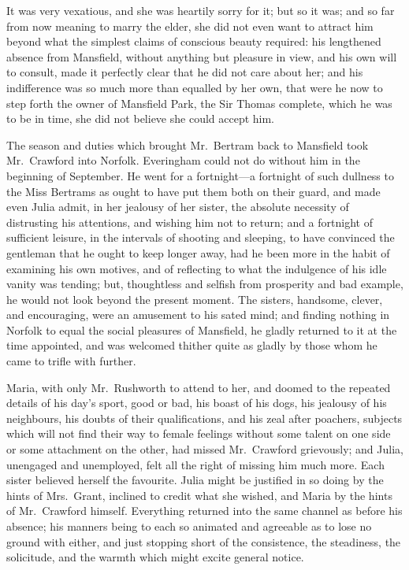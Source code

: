 It was very vexatious, and she was heartily sorry for it;
but so it was; and so far from now meaning to marry
the elder, she did not even want to attract him beyond
what the simplest claims of conscious beauty required:
his lengthened absence from Mansfield, without anything
but pleasure in view, and his own will to consult, made it
perfectly clear that he did not care about her; and his
indifference was so much more than equalled by her own,
that were he now to step forth the owner of Mansfield Park,
the Sir Thomas complete, which he was to be in time, she did
not believe she could accept him.

The season and duties which brought Mr.\ Bertram back to
Mansfield took Mr.\ Crawford into Norfolk.  Everingham could
not do without him in the beginning of September.  He went
for a fortnight---a fortnight of such dullness to the Miss
Bertrams as ought to have put them both on their guard,
and made even Julia admit, in her jealousy of her sister,
the absolute necessity of distrusting his attentions,
and wishing him not to return; and a fortnight of sufficient
leisure, in the intervals of shooting and sleeping, to have
convinced the gentleman that he ought to keep longer away,
had he been more in the habit of examining his own motives,
and of reflecting to what the indulgence of his idle vanity
was tending; but, thoughtless and selfish from prosperity
and bad example, he would not look beyond the present moment.
The sisters, handsome, clever, and encouraging, were an
amusement to his sated mind; and finding nothing in Norfolk
to equal the social pleasures of Mansfield, he gladly
returned to it at the time appointed, and was welcomed
thither quite as gladly by those whom he came to trifle with
further.

Maria, with only Mr.\ Rushworth to attend to her, and doomed
to the repeated details of his day's sport, good or bad,
his boast of his dogs, his jealousy of his neighbours,
his doubts of their qualifications, and his zeal after poachers,
subjects which will not find their way to female feelings
without some talent on one side or some attachment on
the other, had missed Mr.\ Crawford grievously; and Julia,
unengaged and unemployed, felt all the right of missing him
much more.  Each sister believed herself the favourite.
Julia might be justified in so doing by the hints
of Mrs.\ Grant, inclined to credit what she wished,
and Maria by the hints of Mr.\ Crawford himself.
Everything returned into the same channel as before his absence;
his manners being to each so animated and agreeable
as to lose no ground with either, and just stopping short
of the consistence, the steadiness, the solicitude,
and the warmth which might excite general notice.

